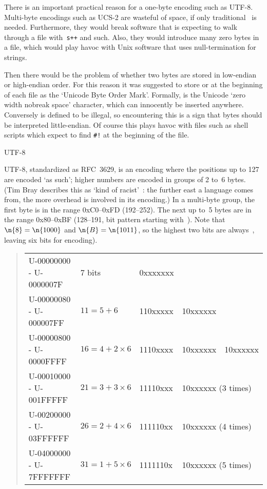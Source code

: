There is an important practical reason for a one-byte encoding such as
UTF-8. Multi-byte encodings such as
UCS-2 are wasteful of space, if only traditional \ascii\ is
needed. Furthermore, they would break software that is expecting to
walk through a file with~\verb-s++- and such. Also, they would
introduce many zero bytes in a file, which would play havoc with Unix
software that uses null-termination for strings. 

Then there would be
the problem of whether two bytes are stored in low-endian or
high-endian order. For this reason it was suggested to store 
or  at the beginning of each file as the `Unicode Byte Order
Mark'. Formally,  is the Unicode `zero width nobreak space'
character, which can innocently be inserted anywhere. Conversely
 is defined to be illegal, so encountering this is a sign that
bytes should be interpreted little-endian.
Of course this plays havoc with files such as shell scripts
which expect to find \verb+#!+ at the beginning of the file.

 {UTF-8}

UTF-8, standardized as RFC~3629, is an encoding where the positions up
to 127 are encoded `as such'; higher numbers are encoded in groups of
2 to~6 bytes. (Tim Bray describes this as `kind of
racist'~\cite{bray-bytes}: the further east a language comes from, the
more overhead is involved in its encoding.)  In a multi-byte group,
the first byte is in the range 0xC0--0xFD (192--252). The next up to~5
bytes are in the range 0x80--0xBF (128--191, bit pattern starting
with~). Note that $\n{8}=\n{1000}$ and $\n{B}=\n{1011}$, so the
highest two bits are always~, leaving six bits for encoding).

\begin{quote}\begin{footnotesize}
\begin{ttfamily}\begin{tabular}{|l|llll|}
\hline
U-00000000 - U-0000007F&\textrm{7 bits}&
0xxxxxxx&&\\
U-00000080 - U-000007FF&$11=5+6$&
110xxxxx&10xxxxxx&\\
U-00000800 - U-0000FFFF&$16=4+2\times6$&
1110xxxx&10xxxxxx&10xxxxxx\\
U-00010000 - U-001FFFFF&$21=3+3\times6$&
11110xxx&\multicolumn{2}{l|}{10xxxxxx (3 times)}\\
U-00200000 - U-03FFFFFF&$26=2+4\times6$&
111110xx&\multicolumn{2}{l|}{10xxxxxx (4 times)}\\
U-04000000 - U-7FFFFFFF&$31=1+5\times6$&
1111110x&\multicolumn{2}{l|}{10xxxxxx (5 times)}\\\hline
  \end{tabular}
\end{ttfamily}
  \end{footnotesize}
\end{quote}

